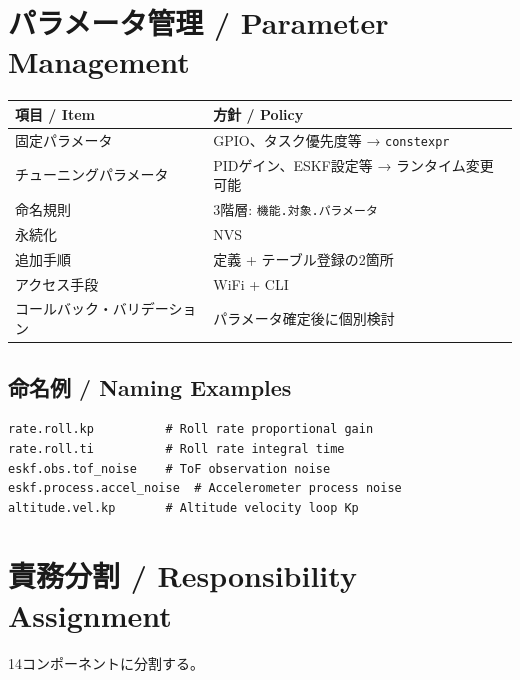 \documentclass[a4paper,11pt]{article}
\newcommand{\thead}[1]{\textbf{\color{accentdark}#1}}
\begin{document}
\section{パラメータ管理 / Parameter Management}

\begin{table}[h]
\centering
\begin{tabular}{@{}ll@{}}
\toprule
\thead{項目 / Item} & \thead{方針 / Policy} \\
\midrule
固定パラメータ & GPIO、タスク優先度等 → \texttt{constexpr} \\
チューニングパラメータ & PIDゲイン、ESKF設定等 → ランタイム変更可能 \\
命名規則 & 3階層: \texttt{機能.対象.パラメータ} \\
永続化 & NVS \\
追加手順 & 定義 + テーブル登録の2箇所 \\
アクセス手段 & WiFi + CLI \\
コールバック・バリデーション & パラメータ確定後に個別検討 \\
\bottomrule
\end{tabular}
\end{table}

\subsection{命名例 / Naming Examples}

\begin{lstlisting}
rate.roll.kp          # Roll rate proportional gain
rate.roll.ti          # Roll rate integral time
eskf.obs.tof_noise    # ToF observation noise
eskf.process.accel_noise  # Accelerometer process noise
altitude.vel.kp       # Altitude velocity loop Kp
\end{lstlisting}

\section{責務分割 / Responsibility Assignment}

14コンポーネントに分割する。
\end{document}
